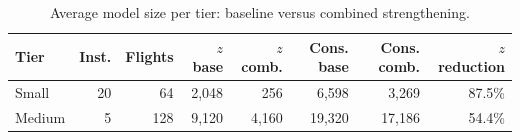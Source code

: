 \begin{table}[htbp]
\centering\small
\caption{Average model size per tier: baseline versus combined strengthening.}
\label{tab:strength_bounds_model_size}
\begin{tabular}{lrrrrrrr}
\toprule
Tier & Inst. & Flights & $z$ base & $z$ comb. & Cons. base & Cons. comb. & $z$ reduction \\
\midrule
Small & 20 & 64 & 2,048 & 256 & 6,598 & 3,269 & 87.5\% \\
Medium & 5 & 128 & 9,120 & 4,160 & 19,320 & 17,186 & 54.4\% \\
\bottomrule
\end{tabular}
\end{table}
